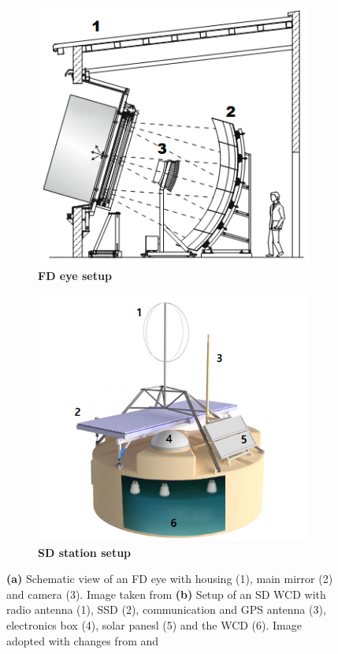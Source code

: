 \begin{figure}
	\begin{subfigure}[b]{0.5\textwidth}
		\centering
		\includegraphics[width=\textwidth]{./imgs/auger_fd.png}
		\caption{\textbf{FD eye setup}}
		\label{fig:fd-eye}
	\end{subfigure}
	\hfill
	\begin{subfigure}[b]{0.5\textwidth}
		\centering
		\includegraphics[width=\textwidth]{./imgs/auger_sd.png}
		\caption{\textbf{SD station setup}}
		\label{fig:sd-station}
	\end{subfigure}
	\caption{\textbf{(a)} Schematic view of an FD eye with housing (1), main mirror (2) and camera (3). Image taken from \cite{FDReconstruction} \textbf{(b)} Setup
	of an SD WCD with radio antenna (1), SSD (2), communication and GPS antenna (3), electronics box (4), solar panesl (5) and the WCD (6). Image adopted with 
	changes from \cite{UUBstation} and \cite{waterTank}}
\end{figure}


